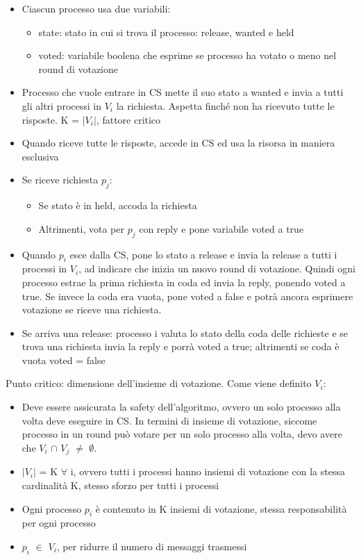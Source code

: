 \documentclass{article}
\begin{document}
\begin{itemize}
\item Ciascun processo usa due variabili:
\begin{itemize}
\item state: stato in cui si trova il processo: release, wanted e held
\item voted: variabile boolena che esprime se processo ha votato o  meno nel round di votazione
\end{itemize}
\item Processo che vuole entrare in CS mette il suo stato a wanted e invia a tutti gli altri processi in $V_i$ la richiesta. Aspetta finché non ha ricevuto tutte le risposte. K = $|V_i|$, fattore critico
\item Quando riceve tutte le risposte, accede in CS ed usa la risorsa in maniera esclusiva
\item Se riceve richiesta $p_j$:
\begin{itemize}
\item Se stato è in held, accoda la richiesta
\item Altrimenti, vota per $p_j$ con reply e pone variabile voted a true
\end{itemize}
\item Quando $p_i$ esce dalla CS, pone lo stato a release e invia la release a tutti i processi in $V_i$, ad indicare che inizia un nuovo round di votazione. Quindi ogni processo estrae la prima richiesta in coda ed invia la reply, ponendo voted a true. Se invece la coda era vuota, pone voted a false e potrà ancora esprimere votazione se riceve una richiesta.
\item Se arriva una release: processo i valuta lo stato della coda delle richieste e se trova una richiesta invia la reply e porrà voted a true; altrimenti se coda è vuota voted = false
\end{itemize}
Punto critico: dimensione dell'insieme di votazione. Come viene definito $V_i$:
\begin{itemize}
\item Deve essere assicurata la safety dell'algoritmo, ovvero un solo processo alla volta deve eseguire in CS. In termini di insieme di votazione, siccome processo in un round può votare per un solo processo alla volta, devo avere che $V_i$ $\cap$ $V_j$ $\neq$ $\emptyset$.
\item $|V_i|$ = K $\forall$ i, ovvero tutti i processi hanno insiemi di votazione con la stessa cardinalità K, stesso sforzo per tutti i processi
\item Ogni processo $p_i$ è contenuto in K insiemi di votazione, stessa responsabilità per ogni processo
\item $p_i$ $\in$ $V_i$, per ridurre il numero di messaggi trasmessi
\end{itemize}
\end{document}
